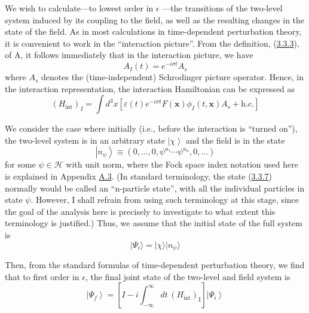 \documentclass[11pt,a4paper]{article}
\providecommand{\ket}[1]{\left\lvert#1\right\rangle}
\begin{document}
We wish to calculate---to lowest order in \(\epsilon\) ---the transitions of the two-level system induced by its coupling to the field, as well as the resulting changes in the state of the field. As in most calculations in time-dependent perturbation theory, it is convenient to work in the ``interaction picture''. From the definition, (\hyperref[eq:3.3.3]{3.3.3}), of A, it follows immediately that in the interaction picture, we have
\begin{equation*}
A_{I}(t) = e^{-i\sigma t} A_{s} \tag{3.3.5}\label{eq:3.3.5}
\end{equation*}
where \(A_s\) denotes the (time-independent) Schrodinger picture operator. Hence, in the interaction representation, the interaction Hamiltonian can be expressed as
\begin{equation*}
(H_{\mathrm{int}})_{I} = \int d^{3}x [ \varepsilon(t) e^{-i\sigma t} F(\mathbf{x}) \phi_{I}(t, \mathbf{x}) A_{s} + \mathrm{h.c.} ] \tag{3.3.6}\label{eq:3.3.6}
\end{equation*}

We consider the case where initially (i.e., before the interaction is ``turned on''), the two-level system is in an arbitrary state \(\ket{\chi}\) and the field is in the state
\begin{equation*}
\ket{n_\psi}\equiv(0,\ldots,0,\psi^{a_1}\cdots\psi^{a_n},0,\ldots) \tag{3.3.7}\label{eq:3.3.7}
\end{equation*}
for some \(\psi \in \mathcal{H}\) with unit norm, where the Fock space index notation used here is explained in Appendix \hyperlink{sec:A.3}{A.3}. (In standard terminology, the state (\hyperref[eq:3.3.7]{3.3.7}) normally would be called an ``n-particle state'', with all the individual particles in state \(\psi\). However, I shall refrain from using such terminology at this stage, since the goal of the analysis here is precisely to investigate to what extent this terminology is justified.) Thus, we assume that the initial state of the full system is
\begin{equation*}
\lvert \Psi_i\rangle = \lvert \chi\rangle \lvert n_{\psi}\rangle \tag{3.3.8}\label{eq:3.3.8}
\end{equation*}

Then, from the standard formulas of time-dependent perturbation theory, we find that to first order in \(\epsilon\), the final joint state of the two-level and field system is
\begin{equation*}
\ket{\Psi_f}=[I-i\int_{-\infty}^{\infty}dt\,(H_{\mathrm{int}})_{\mathrm{I}}]\ket{\Psi_i} \tag{3.3.9}\label{eq:3.3.9}
\end{equation*}
\end{document}
